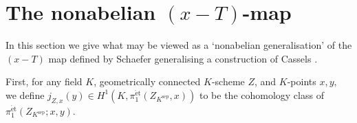 \documentclass[11pt]{amsart}
\theoremstyle{plain}
\theoremstyle{definition}
\newcommand{\Ind}{\mathrm{Ind}}
\newcommand{\sep}{\mathrm{sep}}
\newcommand{\et}{\mathrm{\acute{e}t}}
\begin{document}

\section{The nonabelian $(x-T)$-map}
In this section we give what may be viewed as a `nonabelian generalisation' of the $(x-T)$ map defined by Schaefer \cite{schaefer} generalising a construction of Cassels \cite{cassels}.

First, for any field $K$, geometrically connected $K$-scheme $Z$, and $K$-points $x,y,$ we define $j_{Z,x}(y)\in H^1 (K,\pi _1 ^{\et }(Z_{K^{\sep }},x))$ to be the cohomology class of $\pi _1 ^{\et }(Z_{K^{\sep }};x,y)$.
\end{document}
